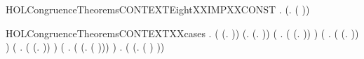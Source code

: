 \newcommand{\HOLCongruenceTheoremsCONTEXTEightXXbackward}{\UseVerbatim{HOLCongruenceTheoremsCONTEXTEightXXbackward}}
\begin{SaveVerbatim}{HOLCongruenceTheoremsCONTEXTEightXXIMPXXCONST}
\HOLTokenTurnstile{} \HOLSymConst{\HOLTokenForall{}} .  (\HOLTokenLambda{}.   ( )) \HOLSymConst{\HOLTokenImp{}}  
\end{SaveVerbatim}
\newcommand{\HOLCongruenceTheoremsCONTEXTEightXXIMPXXCONST}{\UseVerbatim{HOLCongruenceTheoremsCONTEXTEightXXIMPXXCONST}}
\begin{SaveVerbatim}{HOLCongruenceTheoremsCONTEXTXXcases}
\HOLTokenTurnstile{} \HOLSymConst{\HOLTokenForall{}}.
         \HOLSymConst{\HOLTokenEquiv{}}
       ( \HOLSymConst{=} (\HOLTokenLambda{}. )) \HOLSymConst{\HOLTokenDisj{}} (\HOLSymConst{\HOLTokenExists{}}.  \HOLSymConst{=} (\HOLTokenLambda{}. )) \HOLSymConst{\HOLTokenDisj{}}
       (\HOLSymConst{\HOLTokenExists{}} . ( \HOLSymConst{=} (\HOLTokenLambda{}.  )) \HOLSymConst{\HOLTokenConj{}}  ) \HOLSymConst{\HOLTokenDisj{}}
       (\HOLSymConst{\HOLTokenExists{}} .
            ( \HOLSymConst{=} (\HOLTokenLambda{}.   \HOLSymConst{\ensuremath{+}}  )) \HOLSymConst{\HOLTokenConj{}}   \HOLSymConst{\HOLTokenConj{}}  ) \HOLSymConst{\HOLTokenDisj{}}
       (\HOLSymConst{\HOLTokenExists{}} .
            ( \HOLSymConst{=} (\HOLTokenLambda{}.   \HOLSymConst{\ensuremath{\parallel}}  )) \HOLSymConst{\HOLTokenConj{}}   \HOLSymConst{\HOLTokenConj{}}  ) \HOLSymConst{\HOLTokenDisj{}}
       (\HOLSymConst{\HOLTokenExists{}} . ( \HOLSymConst{=} (\HOLTokenLambda{}. \HOLConst{\ensuremath{\nu}}  ( ))) \HOLSymConst{\HOLTokenConj{}}  ) \HOLSymConst{\HOLTokenDisj{}}
       \HOLSymConst{\HOLTokenExists{}} . ( \HOLSymConst{=} (\HOLTokenLambda{}.  ( ) )) \HOLSymConst{\HOLTokenConj{}}  
\end{SaveVerbatim}
